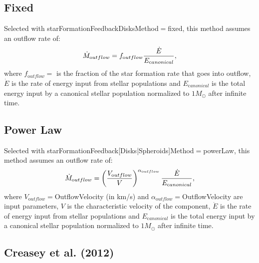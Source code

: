 \subsection{Fixed}

Selected with {\normalfont \ttfamily starFormationFeedbackDisksMethod}$=${\normalfont \ttfamily fixed}, this method assumes an outflow rate of:
\begin{equation}
 \dot{M}_{\mathrm outflow} = f_{\mathrm outflow} {\dot{E} \over E_{\mathrm canonical}},
\end{equation}
where $f_{\mathrm outflow}=${\normalfont \ttfamily [diskOutflowFraction]} is the fraction of the star formation rate that goes into outflow, $\dot{E}$ is the rate of energy input from stellar populations and $E_{\mathrm canonical}$ is the total energy input by a canonical stellar population normalized to $1 M_\odot$ after infinite time.

\subsection{Power Law}

Selected with {\normalfont \ttfamily starFormationFeedback[Disks|Spheroids]Method}$=${\normalfont \ttfamily powerLaw}, this method assumes an outflow rate of:
\begin{equation}
 \dot{M}_{\mathrm outflow} = \left({V_{\mathrm outflow} \over V}\right)^{\alpha_{\mathrm outflow}} {\dot{E} \over E_{\mathrm canonical}},
\end{equation}
where $V_{\mathrm outflow}=${\normalfont {}OutflowVelocity} (in km/s) and $\alpha_{\mathrm outflow}=${\normalfont {}OutflowVelocity} are input parameters, $V$ is the characteristic velocity of the component, $\dot{E}$ is the rate of energy input from stellar populations and $E_{\mathrm canonical}$ is the total energy input by a canonical stellar population normalized to $1 M_\odot$ after infinite time.

\subsection{Creasey et al. (2012)}

